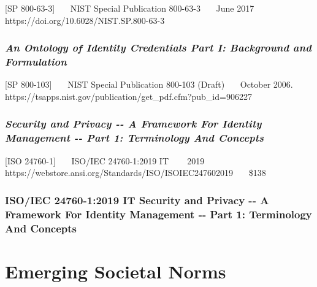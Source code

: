 {[}SP 800-63-3{]}~~~ NIST Special Publication 800-63-3~~~ June 2017~~~
https://doi.org/10.6028/NIST.SP.800-63-3~~~

\hypertarget{an-ontology-of-identity-credentials-part-i-background-and-formulation}{%
\subsubsection{\texorpdfstring{\emph{An Ontology of Identity Credentials
Part I: Background and
Formulation}}{An Ontology of Identity Credentials Part I: Background and Formulation}}\label{an-ontology-of-identity-credentials-part-i-background-and-formulation}}

{[}SP 800-103{]}~~~ NIST Special Publication 800-103 (Draft)~~~ October
2006.~~~
https://tsapps.nist.gov/publication/get\_pdf.cfm?pub\_id=906227~~~

\hypertarget{security-and-privacy----a-framework-for-identity-management----part-1-terminology-and-concepts}{%
\subsubsection{\texorpdfstring{\emph{Security and Privacy -\/- A Framework
For Identity Management -\/- Part 1: Terminology And
Concepts}}{Security and Privacy -\/- A Framework For Identity Management -\/- Part 1: Terminology And Concepts}}\label{security-and-privacy----a-framework-for-identity-management----part-1-terminology-and-concepts}}

{[}ISO 24760-1{]}~~~ ISO/IEC 24760-1:2019 IT ~~~ 2019~~~
https://webstore.ansi.org/Standards/ISO/ISOIEC247602019~~~ \$138

\hypertarget{isoiec-24760-12019-it-security-and-privacy----a-framework-for-identity-management----part-1-terminology-and-concepts}{%
\subsubsection{ISO/IEC 24760-1:2019 IT Security and Privacy -\/- A Framework
For Identity Management -\/- Part 1: Terminology And
Concepts}\label{isoiec-24760-12019-it-security-and-privacy----a-framework-for-identity-management----part-1-terminology-and-concepts}}

\hypertarget{emerging-societal-norms}{%
\section{Emerging Societal Norms}\label{emerging-societal-norms}}

